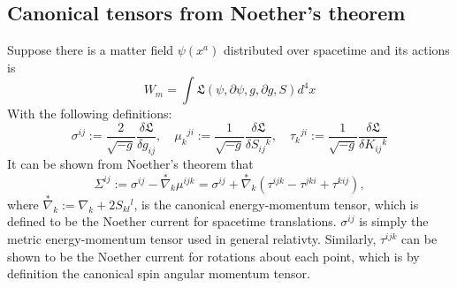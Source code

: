 \documentclass[12pt]{article}
\begin{document}
\subsection{Canonical tensors from Noether's theorem}
Suppose there is a matter field $\psi(x^a)$ distributed over spacetime and its actions is
\[ W_m = \int \mathfrak{L}(\psi,\partial\psi, g,\partial g, S) d^4x \]
With the following definitions:
\[ \sigma^{ij} := \frac{2}{\sqrt{-g}}\frac{\delta\mathfrak{L}}{\delta g_{ij}},
\quad \mu_{k}{}^{ji} := \frac{1}{\sqrt{-g}}\frac{\delta\mathfrak{L}}{\delta S_{ij}{}^k},
\quad \tau_k{}^{ji} := \frac{1}{\sqrt{-g}}\frac{\delta\mathfrak{L}}{\delta K_{ij}{}^k}\]
It can be shown from Noether's theorem that
\[ \Sigma^{ij} := \sigma^{ij} - \stackrel{*}{\nabla}_k\mu^{ijk}  = \sigma^{ij} + \stackrel{*}{\nabla}_k(\tau^{ijk} - \tau^{jki} + \tau^{kij}),\]
where $\stackrel{*}{\nabla}_k := \nabla_k + 2S_{kl}{}^l$, is the canonical energy-momentum tensor, which is defined to be the Noether current for spacetime translations. $\sigma^{ij}$ is simply the metric energy-momentum tensor used in general relativty. Similarly, $\tau^{ijk}$ can be shown to be the Noether current for rotations about each point, which is by definition the canonical spin angular momentum tensor.
\end{document}
